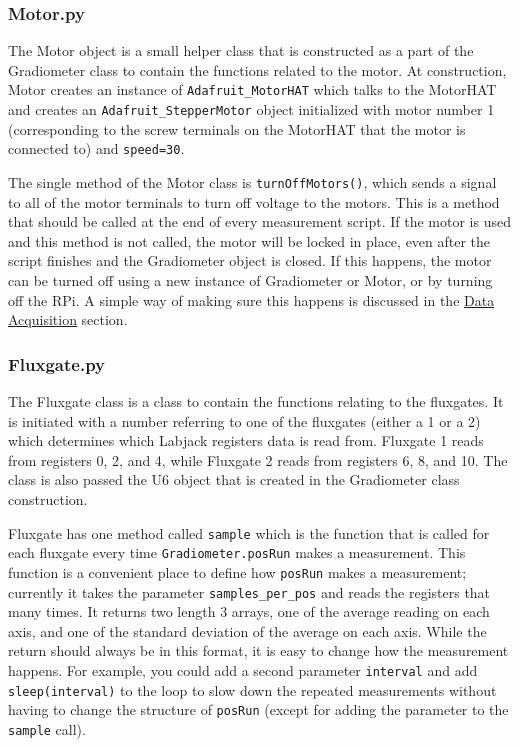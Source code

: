 \documentclass{TheMartianReport}
\newcommand{\pyinline}[1]{\texttt{#1}}
\begin{document}
\subsubsection{Motor.py}
The Motor object is a small helper class that is constructed as a part of the Gradiometer class to contain the functions related to the motor. At construction, Motor creates an instance of \pyinline{Adafruit_MotorHAT} which talks to the MotorHAT and creates an \pyinline{Adafruit_StepperMotor} object initialized with motor number 1 (corresponding to the screw terminals on the MotorHAT that the motor is connected to) and \pyinline{speed=30}.

The single method of the Motor class is \pyinline{turnOffMotors()}, which sends a signal to all of the motor terminals to turn off voltage to the motors. This is a method that should be called at the end of every measurement script. If the motor is used and this method is not called, the motor will be locked in place, even after the script finishes and the Gradiometer object is closed. If this happens, the motor can be turned off using a new instance of Gradiometer or Motor, or by turning off the RPi. A simple way of making sure this happens is discussed in the \hyperref[subsec:Acquisition]{Data Acquisition} section.

\subsubsection{Fluxgate.py}
The Fluxgate class is a class to contain the functions relating to the fluxgates. It is initiated with a number referring to one of the fluxgates (either a 1 or a 2) which determines which Labjack registers data is read from. Fluxgate 1 reads from registers 0, 2, and 4, while Fluxgate 2 reads from registers 6, 8, and 10. The class is also passed the U6 object that is created in the Gradiometer class construction.

Fluxgate has one method called \pyinline{sample} which is the function that is called for each fluxgate every time \pyinline{Gradiometer.posRun} makes a measurement. This function is a convenient place to define how \pyinline{posRun} makes a measurement; currently it takes the parameter \pyinline{samples_per_pos} and reads the registers that many times. It returns two length 3 arrays, one of the average reading on each axis, and one of the standard deviation of the average on each axis. While the return should always be in this format, it is easy to change how the measurement happens. For example, you could add a second parameter \pyinline{interval} and add \pyinline{sleep(interval)} to the loop to slow down the repeated measurements without having to change the structure of \pyinline{posRun} (except for adding the parameter to the \pyinline{sample} call).
\end{document}
